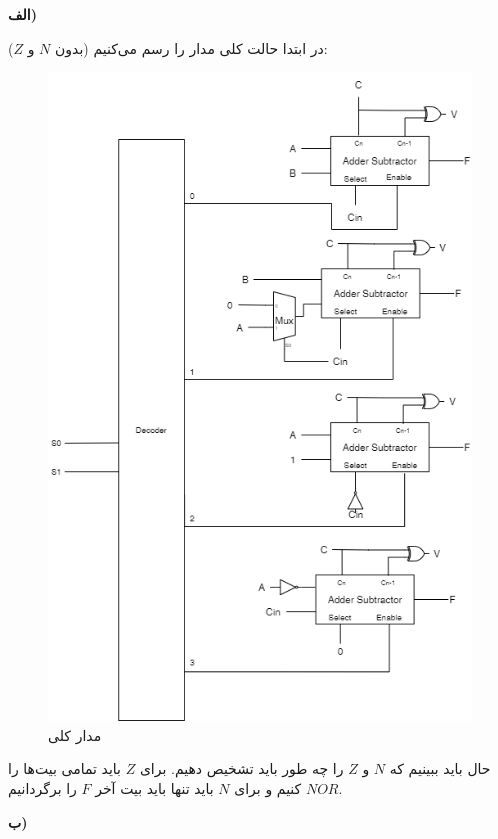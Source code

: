 
\noindent
\textbf{الف)}

در ابتدا حالت کلی مدار را رسم می‌کنیم
(بدون $N$ و $Z$):

\begin{figure}[H]
    \centering
    \includegraphics[scale=0.5]{source/1-1.png}
    \caption{مدار کلی }
    \label{1-1-circuit}
\end{figure}

حال باید ببینیم که
$N$
و
$Z$
را چه طور باید تشخیص دهیم. برای
$Z$
باید تمامی بیت‌ها را
$NOR$
کنیم و برای
$N$
باید تنها باید بیت آخر
$F$
را برگردانیم.

\noindent
\textbf{ب)}

